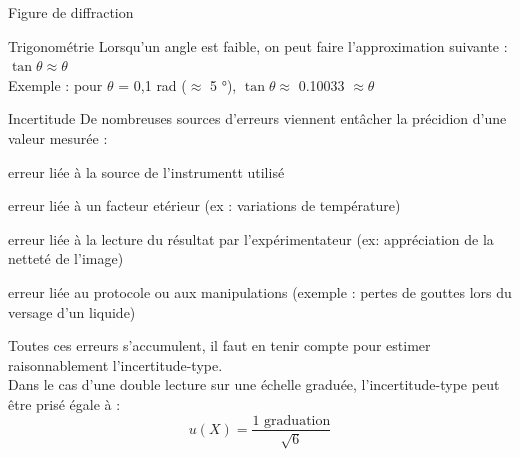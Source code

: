 \documentclass[a4paper,11pt,fleqn]{article}%
\begin{document}
\begin{minipage}[t]{.55\textwidth}
\begin{documentboxenv}{Figure de diffraction}
\end{documentboxenv}
\begin{documentboxenv}{Trigonométrie}
Lorsqu'un angle est faible, on peut faire l'approximation suivante : $\tan{\theta} \approx \theta$\\
Exemple : pour $\theta$ = 0,1 \unit{\radian} ($\approx$ 5 \unit{\degree}), $\tan{\theta} \approx$ \num{0,10033} $\approx \theta$  
\end{documentboxenv}
\end{minipage}

\vspace{1em}

\noindent\begin{minipage}{\linewidth}
\begin{documentboxenv}{Incertitude}
De nombreuses sources d'erreurs viennent entâcher la précidion d'une valeur mesurée :
\begin{itemize*}
    \item erreur liée à la source de l'instrumentt utilisé
    \item erreur liée à un facteur etérieur (ex : variations de température)
    \item erreur liée à la lecture du résultat par l'expérimentateur (ex: appréciation de la netteté de l'image)
    \item erreur liée au protocole ou aux manipulations (exemple : pertes de gouttes lors du versage d'un liquide)
\end{itemize*}
Toutes ces erreurs s'accumulent, il faut en tenir compte pour estimer raisonnablement l'incertitude-type.\\
Dans le cas d'une double lecture sur une échelle graduée, l'incertitude-type peut être prisé égale à :
$$ u(X) = \dfrac{1 \text{ graduation}}{\sqrt{6}} $$
\end{documentboxenv}
\end{minipage}
\end{document}
